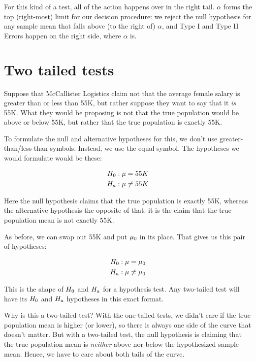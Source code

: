 \documentclass[../../../main.tex]{subfiles}
\begin{document}
\noindent
For this kind of a test, all of the action happens over in the right tail. $\alpha$ forms the top (right-most) limit for our decision procedure: we reject the null hypothesis for any sample mean that falls above (to the right of) $\alpha$, and Type I and Type II Errors happen on the right side, where $\alpha$ is.



\section{Two tailed tests}

Suppose that McCallister Logistics claim not that the average female salary is greater than or less than 55K, but rather suppose they want to say that it \emph{is} 55K. What they would be proposing is not that the true population would be above or below 55K, but rather that the true population is exactly 55K.

To formulate the null and alternative hypotheses for this, we don't use greater-than/less-than symbols. Instead, we use the equal symbol. The hypotheses we would formulate would be these:

\begin{align*}
  \NullHyp/: \populationmean = 55K \\
  \AltHyp/: \populationmean \not = 55K
\end{align*}

\noindent
Here the null hypothesis claims that the true population is exactly 55K, whereas the alternative hypothesis the opposite of that: it is the claim that the true population mean is not exactly 55K.

As before, we can swap out 55K and put $\HypPopMean/$ in its place. That gives us this pair of hypotheses:

\begin{align*}
  \NullHyp/: \populationmean = \HypPopMean/ \\
  \AltHyp/: \populationmean \not = \HypPopMean/
\end{align*}

\noindent
This is the shape of $\NullHyp/$ and $\AltHyp/$ for a  hypothesis test. Any two-tailed test will have its $\NullHyp/$ and $\AltHyp/$ hypotheses in this exact format.

Why is this a two-tailed test? With the one-tailed tests, we didn't care if the true population mean is higher (or lower), so there is always one side of the curve that doesn't matter. But with a two-tailed test, the null hypothesis is claiming that the true population mean is \emph{neither} above nor below the hypothesized sample mean. Hence, we have to care about both tails of the curve.
\end{document}
